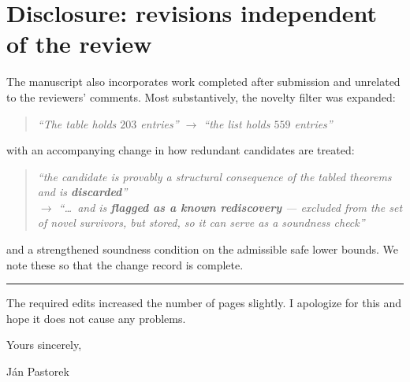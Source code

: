 \documentclass[11pt,a4paper]{article}
\newenvironment{chg}{%
  \begin{quote}\small\color{black!80}\itshape}{\end{quote}}
\begin{document}
\section{Disclosure: revisions independent of the review}
The manuscript also incorporates work completed after submission and unrelated to
the reviewers' comments. Most substantively, the novelty filter was expanded:
\begin{chg}
``The table holds \textbf{$203$} entries'' $\rightarrow$ ``the list holds \textbf{$559$} entries''
\end{chg}
with an accompanying change in how redundant candidates are treated:
\begin{chg}
``the candidate is provably a structural consequence of the tabled theorems and
is \textbf{discarded}''\\
$\rightarrow$ ``\dots\ and is \textbf{flagged as a known rediscovery} ---
excluded from the set of novel survivors, but stored, so it can serve as a
soundness check''
\end{chg}
and a strengthened soundness condition on the admissible safe lower bounds. We
note these so that the change record is complete.

\bigskip\hrule\bigskip

The required edits increased the number of pages slightly. I apologize for this
and hope it does not cause any problems.

\bigskip
Yours sincerely,

\bigskip
Ján Pastorek
\end{document}
